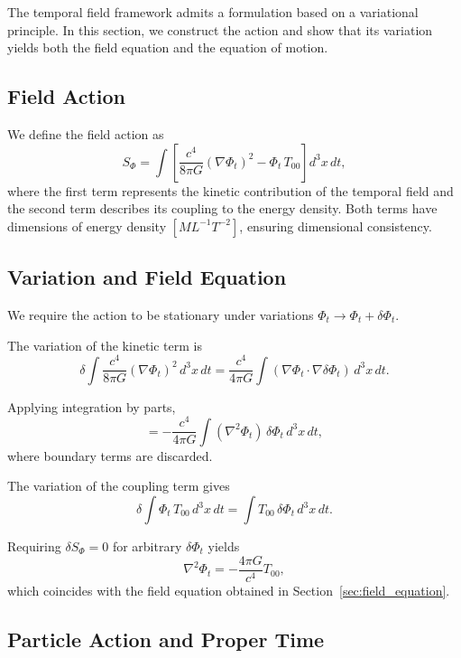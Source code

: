 \documentclass[12pt]{article}
\begin{document}
The temporal field framework admits a formulation based on a variational principle. In this section, we construct the action and show that its variation yields both the field equation and the equation of motion.

\subsection{Field Action}
\label{sec:field_action}

We define the field action as
\begin{equation}
S_\Phi = \int \left[ \frac{c^4}{8\pi G}(\nabla\Phi_t)^2 - \Phi_t\, T_{00} \right] d^3x\, dt ,
\label{eq:field_action}
\end{equation}
where the first term represents the kinetic contribution of the temporal field and the second term describes its coupling to the energy density. Both terms have dimensions of energy density $[M L^{-1} T^{-2}]$, ensuring dimensional consistency.

\subsection{Variation and Field Equation}
\label{sec:field_variation}

We require the action to be stationary under variations $\Phi_t \to \Phi_t + \delta\Phi_t$.

The variation of the kinetic term is
$$
\delta \int \frac{c^4}{8\pi G}(\nabla\Phi_t)^2 \, d^3x\, dt
= \frac{c^4}{4\pi G}\int (\nabla\Phi_t \cdot \nabla\delta\Phi_t)\, d^3x\, dt .
$$

Applying integration by parts,
$$
= -\frac{c^4}{4\pi G}\int (\nabla^2\Phi_t)\,\delta\Phi_t\, d^3x\, dt ,
$$
where boundary terms are discarded.

The variation of the coupling term gives
$$
\delta \int \Phi_t\, T_{00}\, d^3x\, dt
= \int T_{00}\,\delta\Phi_t\, d^3x\, dt .
$$

Requiring $\delta S_\Phi = 0$ for arbitrary $\delta\Phi_t$ yields
\begin{equation}
\nabla^2\Phi_t = -\frac{4\pi G}{c^4}T_{00} ,
\label{eq:field_eq_var}
\end{equation}
which coincides with the field equation obtained in Section~\ref{sec:field_equation}.

\subsection{Particle Action and Proper Time}
\label{sec:particle_action}
\end{document}
